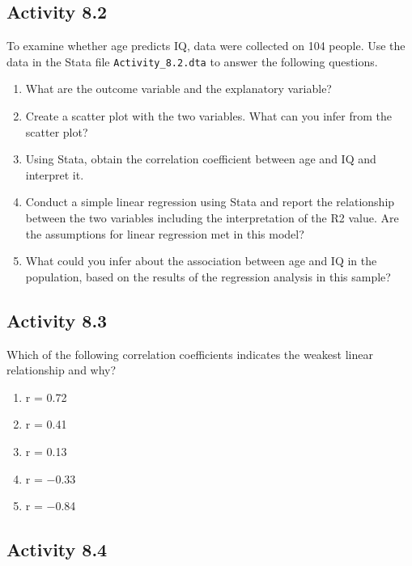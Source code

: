 \documentclass[
]{memoir}
\providecommand{\tightlist}{%
  \setlength{\itemsep}{0pt}\setlength{\parskip}{0pt}}
\begin{document}
\hypertarget{activity-8.2}{%
\subsection*{Activity 8.2}\label{activity-8.2}}

To examine whether age predicts IQ, data were collected on 104 people. Use the data in the Stata file \texttt{Activity\_8.2.dta} to answer the following questions.

\begin{enumerate}
\def\labelenumi{\alph{enumi})}
\tightlist
\item
  What are the outcome variable and the explanatory variable?
\item
  Create a scatter plot with the two variables. What can you infer from the scatter plot?
\item
  Using Stata, obtain the correlation coefficient between age and IQ and interpret it.
\item
  Conduct a simple linear regression using Stata and report the relationship between the two variables including the interpretation of the R2 value. Are the assumptions for linear regression met in this model?
\item
  What could you infer about the association between age and IQ in the population, based on the results of the regression analysis in this sample?
\end{enumerate}

\hypertarget{activity-8.3}{%
\subsection*{Activity 8.3}\label{activity-8.3}}

Which of the following correlation coefficients indicates the weakest linear relationship and why?

\begin{enumerate}
\def\labelenumi{\alph{enumi})}
\tightlist
\item
  r = 0.72
\item
  r = 0.41
\item
  r = 0.13
\item
  r = −0.33
\item
  r = −0.84
\end{enumerate}

\hypertarget{activity-8.4}{%
\subsection*{Activity 8.4}\label{activity-8.4}}
\end{document}

